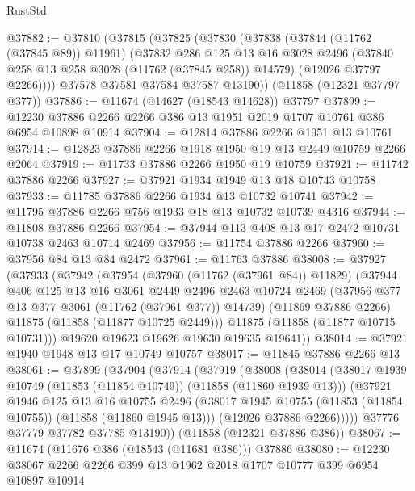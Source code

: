 \begin{lexlean}{RustStd}
\begin{coremodule}
@37882 := @37810
    (@37815
      (@37825
        (@37830
          (@37838
            (@37844 (@11762 (@37845 @89)) @11961)
            (@37832
              @286
              @125
              @13
              @16
              @3028
              @2496
              (@37840 @258 @13 @258 @3028 (@11762 (@37845 @258)) @14579)
              (@12026 @37797 @2266))))
        @37578
        @37581
        @37584
        @37587
        @13190))
    (@11858 (@12321 @37797 @377))
@37886 := @11674 (@14627 (@18543 @14628)) @37797
@37899 := @12230 @37886 @2266 @2266 @386 @13 @1951 @2019 @1707 @10761 @386 @6954 @10898 @10914
@37904 := @12814 @37886 @2266 @1951 @13 @10761
@37914 := @12823 @37886 @2266 @1918 @1950 @19 @13 @2449 @10759 @2266 @2064
@37919 := @11733 @37886 @2266 @1950 @19 @10759
@37921 := @11742 @37886 @2266
@37927 := @37921 @1934 @1949 @13 @18 @10743 @10758
@37933 := @11785 @37886 @2266 @1934 @13 @10732 @10741
@37942 := @11795 @37886 @2266 @756 @1933 @18 @13 @10732 @10739 @4316
@37944 := @11808 @37886 @2266
@37954 := @37944 @113 @408 @13 @17 @2472 @10731 @10738 @2463 @10714 @2469
@37956 := @11754 @37886 @2266
@37960 := @37956 @84 @13 @84 @2472
@37961 := @11763 @37886
@38008 := @37927
    (@37933
      (@37942
        (@37954
          (@37960 (@11762 (@37961 @84)) @11829)
          (@37944
            @406
            @125
            @13
            @16
            @3061
            @2449
            @2496
            @2463
            @10724
            @2469
            (@37956 @377 @13 @377 @3061 (@11762 (@37961 @377)) @14739)
            (@11869 @37886 @2266)
            @11875
            (@11858 (@11877 @10725 @2449)))
          @11875
          (@11858 (@11877 @10715 @10731)))
        @19620
        @19623
        @19626
        @19630
        @19635
        @19641))
@38014 := @37921 @1940 @1948 @13 @17 @10749 @10757
@38017 := @11845 @37886 @2266 @13
@38061 := @37899
    (@37904
      (@37914
        (@37919
          (@38008
            (@38014
              (@38017 @1939 @10749 (@11853 (@11854 @10749)) (@11858 (@11860 @1939 @13)))
              (@37921
                @1946
                @125
                @13
                @16
                @10755
                @2496
                (@38017 @1945 @10755 (@11853 (@11854 @10755)) (@11858 (@11860 @1945 @13)))
                (@12026 @37886 @2266)))))
        @37776
        @37779
        @37782
        @37785
        @13190))
    (@11858 (@12321 @37886 @386))
@38067 := @11674 (@11676 @386 (@18543 (@11681 @386))) @37886
@38080 := @12230 @38067 @2266 @2266 @399 @13 @1962 @2018 @1707 @10777 @399 @6954 @10897 @10914

\end{coremodule}
\end{lexlean}

